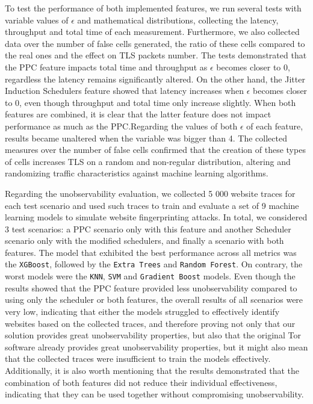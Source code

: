 To test the performance of both implemented features, we run several tests with variable values of $\epsilon$ and mathematical distributions, collecting the latency, throughput and total time of each measurement. Furthermore, we also collected data over the number of false cells generated, the ratio of these cells compared to the real ones and the effect on TLS packets number.
The tests demonstrated that the PPC feature impacts total time and throughput as $\epsilon$ becomes closer to 0, regardless the latency remains significantly altered. On the other hand, the Jitter Induction Schedulers feature showed that latency increases when $\epsilon$ becomes closer to 0, even though throughput and total time only increase slightly. When both features are combined, it is clear that the latter feature does not impact performance as much as the PPC.\@ Regarding the values of both $\epsilon$ of each feature, results became unaltered when the variable was bigger than 4.
The collected measures over the number of false cells confirmed that the creation of these types of cells increases TLS on a random and non-regular distribution, altering and randomizing traffic characteristics against machine learning algorithms.

Regarding the unobservability evaluation, we collected 5 000 website traces for each test scenario and used such traces to train and evaluate a set of 9 machine learning models to simulate website fingerprinting attacks. In total, we considered 3 test scenarios: a PPC scenario only with this feature and another Scheduler scenario only with the modified schedulers, and finally a scenario with both features. The model that exhibited the best performance across all metrics was the \texttt{XGBoost}, followed by the \texttt{Extra Trees} and \texttt{Random Forest}. On contrary, the worst models were the \texttt{KNN}, \texttt{SVM} and \texttt{Gradient Boost} models. Even though the results showed that the PPC feature provided less unobservability compared to using only the scheduler or both features, the overall results of all scenarios were very low, indicating that either the models struggled to effectively identify websites based on the collected traces, and therefore proving not only that our solution provides great unobservability properties, but also that the original Tor software already provides great unobservability properties, but it might also mean that the collected traces were insufficient to train the models effectively. Additionally, it is also worth mentioning that the results demonstrated that the combination of both features did not reduce their individual effectiveness, indicating that they can be used together without compromising unobservability.

